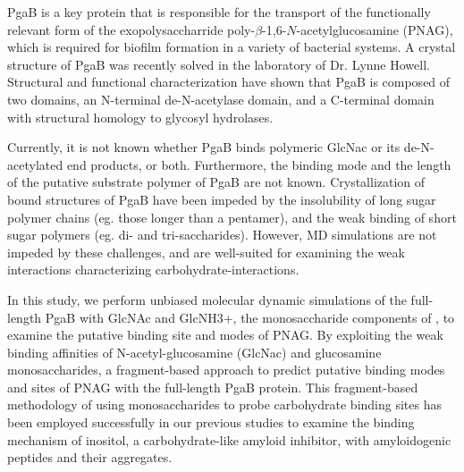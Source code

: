PgaB is a key protein that is responsible for the transport of the functionally relevant form of the exopolysaccharride poly-$\beta$-1,6-$N$-acetylglucosamine (PNAG), which is required for biofilm formation in a variety of bacterial systems. A crystal structure of PgaB was recently solved in the laboratory of Dr. Lynne Howell.\cite{Little:2012dp} Structural and functional characterization have shown that PgaB is composed of two domains, an N-terminal de-N-acetylase domain, and a C-terminal domain with structural homology to glycosyl hydrolases.\cite{Little:2012dp}

Currently, it is not known whether PgaB binds polymeric GlcNac or its de-N-acetylated end products, or both. Furthermore, the binding mode and the length of the putative substrate polymer of PgaB are not known. Crystallization of bound structures of PgaB have been impeded by the insolubility of long sugar polymer chains (eg. those longer than a pentamer), and the weak binding of short sugar polymers (eg. di- and tri-saccharides). However, MD simulations are not impeded by these challenges, and are well-suited for examining the weak interactions characterizing carbohydrate-interactions.

In this study, we perform unbiased molecular dynamic simulations of the full-length PgaB with GlcNAc and GlcNH3+, the monosaccharide components of \pnag, to examine the putative binding site and modes of PNAG.  By exploiting the weak binding affinities of N-acetyl-glucosamine (GlcNac) and glucosamine monosaccharides, a fragment-based approach to predict putative binding modes and sites of PNAG with the full-length PgaB protein. This fragment-based methodology of using monosaccharides to probe carbohydrate binding sites has been employed successfully in our previous studies to examine the binding mechanism of inositol, a carbohydrate-like amyloid inhibitor, with amyloidogenic peptides and their aggregates.\cite{Li:2012bx,Li:2013Abreview}



